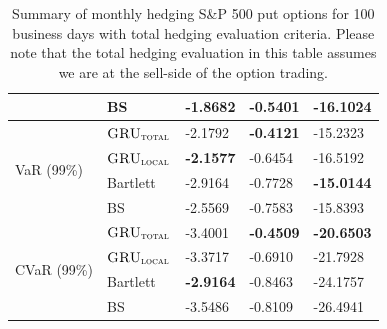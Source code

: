 \documentclass[letterpaper,12pt,titlepage,oneside,final]{book}
\numberwithin{equation}{section}
\theoremstyle{definition}
\newcommand{\modelT}{\textsc{GRU}_{\textsc{total}}}
\newcommand{\modelL}{\textsc{GRU}_{\textsc{local}}}
\begin{document}
\begin{table}[htp!]
\begin{tabular}{ll|l|l|l|}
		\multicolumn{1}{|l|}{}                                & BS       & -1.8682          & -0.5401          & -16.1024          \\ \hline
		\multicolumn{1}{|l|}{\multirow{4}{*}{VaR (99\%)}}     & $\modelT$    & -2.1792          & \textbf{-0.4121} & -15.2323          \\  
		\multicolumn{1}{|l|}{}                                & $\modelL$    & \textbf{-2.1577} & -0.6454          & -16.5192          \\  
		\multicolumn{1}{|l|}{}                                & Bartlett & -2.9164          & -0.7728          & \textbf{-15.0144} \\  
		\multicolumn{1}{|l|}{}                                & BS       & -2.5569          & -0.7583          & -15.8393          \\ \hline
		\multicolumn{1}{|l|}{\multirow{4}{*}{CVaR (99\%)}}    & $\modelT$    & -3.4001          & \textbf{-0.4509}  & \textbf{-20.6503} \\  
		\multicolumn{1}{|l|}{}                                & $\modelL$    & -3.3717          & -0.6910          & -21.7928          \\  
		\multicolumn{1}{|l|}{}                                & Bartlett & \textbf{-2.9164} & -0.8463          & -24.1757          \\  
		\multicolumn{1}{|l|}{}                                & BS       & -3.5486          & -0.8109          & -26.4941          \\ \hline
	\end{tabular}
	\caption{Summary of monthly hedging S\&P 500 put options for 100 business days with total hedging evaluation criteria. Please note that the total hedging evaluation in this table assumes we are at the sell-side of the option trading.}
	\label{table:putTotalM}
\end{table}
\end{document}
